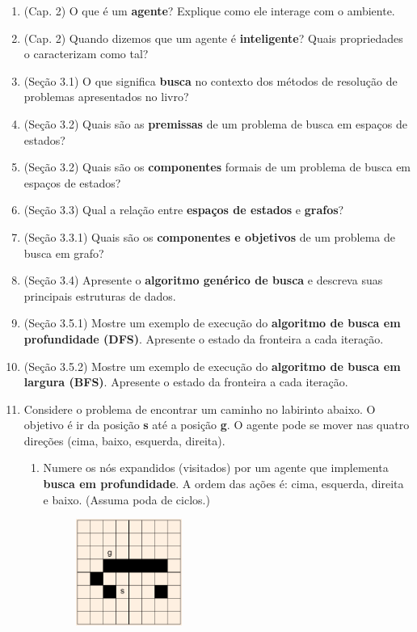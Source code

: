 \documentclass[9pt,a4paper]{extarticle}
\begin{document}
\begin{enumerate}

  \item (Cap. 2) O que é um \textbf{agente}? Explique como ele interage com o ambiente.
  \item (Cap. 2) Quando dizemos que um agente é \textbf{inteligente}? Quais propriedades o caracterizam como tal?
  
  \item (Seção 3.1) O que significa \textbf{busca} no contexto dos métodos de resolução de problemas apresentados no livro?
  \item (Seção 3.2) Quais são as \textbf{premissas} de um problema de busca em espaços de estados?
  \item (Seção 3.2) Quais são os \textbf{componentes} formais de um problema de busca em espaços de estados?
  \item (Seção 3.3) Qual a relação entre \textbf{espaços de estados} e \textbf{grafos}?
  \item (Seção 3.3.1) Quais são os \textbf{componentes e objetivos} de um problema de busca em grafo?
  \item (Seção 3.4) Apresente o \textbf{algoritmo genérico de busca} e descreva suas principais estruturas de dados.
  \item (Seção 3.5.1) Mostre um exemplo de execução do \textbf{algoritmo de busca em profundidade (DFS)}. Apresente o estado da fronteira a cada iteração.
  \item (Seção 3.5.2) Mostre um exemplo de execução do \textbf{algoritmo de busca em largura (BFS)}. Apresente o estado da fronteira a cada iteração.

  \item Considere o problema de encontrar um caminho no labirinto abaixo. O objetivo é ir da posição \textbf{s} até a posição \textbf{g}. O agente pode se mover nas quatro direções (cima, baixo, esquerda, direita). 

  \begin{enumerate}[label*=\alph*)]
    \item Numere os nós expandidos (visitados) por um agente que implementa \textbf{busca em profundidade}. A ordem das ações é: cima, esquerda, direita e baixo. (Assuma poda de ciclos.)
    \begin{figure}[!ht]
      \centering
      \includegraphics[width=0.35\textwidth]{grid.png}
    \end{figure}


\end{enumerate}
\end{enumerate}
\end{document}
